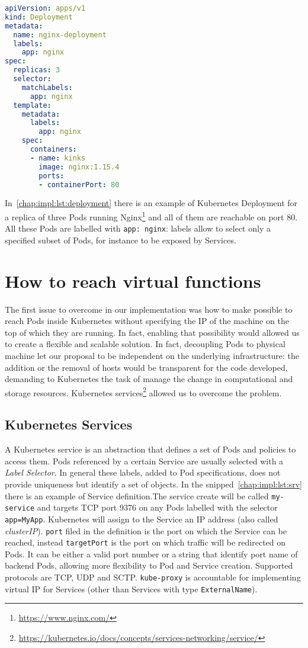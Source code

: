 \begin{lstlisting}[caption={Example of Deployment definition},
                   captionpos=b, language=yaml, label=chap:impl:lst:deployment]
apiVersion: apps/v1
kind: Deployment
metadata:
  name: nginx-deployment
  labels:
    app: nginx
spec:
  replicas: 3
  selector:
    matchLabels:
      app: nginx
  template:
    metadata:
      labels:
        app: nginx
    spec:
      containers:
      - name: kinks
        image: nginx:1.15.4
        ports:
        - containerPort: 80
\end{lstlisting}
In~\ref{chap:impl:lst:deployment} there is an example of Kubernetes Deployment
for a replica of three Pods running Nginx\footnote{\url{https://www.nginx.com/}}
and all of them are reachable on port $80$. All these Pods are labelled with
\texttt{app: nginx}: labels allow to select only a specified subset of Pods,
for instance to be exposed by Services.

\section{How to reach virtual functions}
The first issue to overcome in our implementation was how to make possible to
reach Pods inside Kubernetes without specifying the IP of the machine on the top
of which they are running. In fact, enabling that possibility would allowed us
to create a flexible and scalable solution. In fact, decoupling Pods to physical
machine let our proposal to be independent on the underlying infrastructure: the
addition or the removal of hosts would be transparent for the code developed,
demanding to Kubernetes the task of manage the change in computational and
storage resources. Kubernetes
services\footnote{\url{https://kubernetes.io/docs/concepts/services-networking/service/}}
allowed us to overcome the problem.

\subsection{Kubernetes Services} \label{chap:impl:subsec:services}
A Kubernetes service is an abstraction that defines a set of Pods and policies
to access them. Pods referenced by a certain Service are usually selected with a
\emph{Label Selector}. In general these labels, added to Pod specifications,
does not provide uniqueness but identify a set of objects.
In the snipped~\ref{chap:impl:lst:srv} there is an example of Service
definition.The service create will be called \texttt{my-service} and targets TCP
port 9376 on any Pods labelled with the selector \texttt{app=MyApp}. Kubernetes
will assign to the Service an IP address (also called \emph{clusterIP}). 
\texttt{port} filed in the definition is the port on which the Service can be
reached, instead \texttt{targetPort} is the port on which traffic will be
redirected on Pods. It can be either a valid port number or a string that
identify port name of backend Pods, allowing more flexibility to Pod and Service
creation. Supported protocols are TCP, UDP and SCTP. \texttt{kube-proxy} is
accountable for implementing virtual IP for Services (other than Services with
type \texttt{ExternalName}). 

